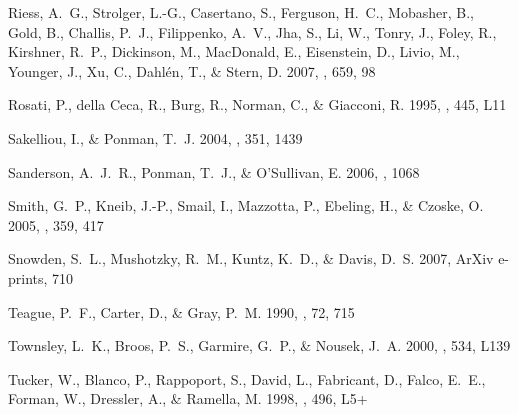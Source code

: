 \documentclass[12pt,preprint]{aastex}
\begin{document}
\begin{thebibliography}{83}
{Riess}, A.~G., {Strolger}, L.-G., {Casertano}, S., {Ferguson}, H.~C.,
  {Mobasher}, B., {Gold}, B., {Challis}, P.~J., {Filippenko}, A.~V., {Jha}, S.,
  {Li}, W., {Tonry}, J., {Foley}, R., {Kirshner}, R.~P., {Dickinson}, M.,
  {MacDonald}, E., {Eisenstein}, D., {Livio}, M., {Younger}, J., {Xu}, C.,
  {Dahl{\'e}n}, T., \& {Stern}, D. 2007, \apj, 659, 98

{Rosati}, P., {della Ceca}, R., {Burg}, R., {Norman}, C., \& {Giacconi}, R.
  1995, \apjl, 445, L11

{Sakelliou}, I., \& {Ponman}, T.~J. 2004, \mnras, 351, 1439

{Sanderson}, A.~J.~R., {Ponman}, T.~J., \& {O'Sullivan}, E. 2006, \mnras, 1068

{Smith}, G.~P., {Kneib}, J.-P., {Smail}, I., {Mazzotta}, P., {Ebeling}, H., \&
  {Czoske}, O. 2005, \mnras, 359, 417

{Snowden}, S.~L., {Mushotzky}, R.~M., {Kuntz}, K.~D., \& {Davis}, D.~S. 2007,
  ArXiv e-prints, 710

{Teague}, P.~F., {Carter}, D., \& {Gray}, P.~M. 1990, \apjs, 72, 715

{Townsley}, L.~K., {Broos}, P.~S., {Garmire}, G.~P., \& {Nousek}, J.~A. 2000,
  \apjl, 534, L139

{Tucker}, W., {Blanco}, P., {Rappoport}, S., {David}, L., {Fabricant}, D.,
  {Falco}, E.~E., {Forman}, W., {Dressler}, A., \& {Ramella}, M. 1998, \apjl,
  496, L5+


\end{thebibliography}
\end{document}
